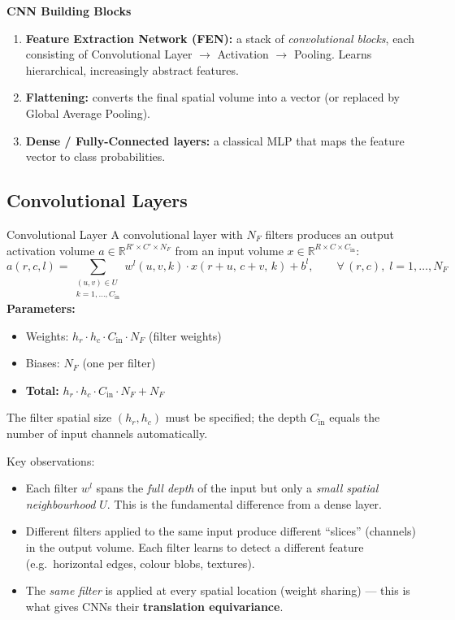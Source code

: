 \documentclass[11pt,a4paper]{article}
\newcommand{\term}[1]{\textcolor{DefGreen}{\textbf{#1}}}
\begin{document}
\begin{tcolorbox}[colback=LightBlue,colframe=AccentBlue,boxrule=0.8pt,arc=3pt]
\textbf{CNN Building Blocks}\\[4pt]
\begin{enumerate}
  \item \textbf{Feature Extraction Network (FEN):} a stack of \emph{convolutional blocks}, each consisting of Convolutional Layer $\to$ Activation $\to$ Pooling. Learns hierarchical, increasingly abstract features.
  \item \textbf{Flattening:} converts the final spatial volume into a vector (or replaced by Global Average Pooling).
  \item \textbf{Dense / Fully-Connected layers:} a classical MLP that maps the feature vector to class probabilities.
\end{enumerate}
\end{tcolorbox}

\subsection{Convolutional Layers}
\label{sec:conv_layers}

\begin{defbox}{Convolutional Layer}
A convolutional layer with $N_F$ filters produces an output activation volume $a \in \mathbb{R}^{R' \times C' \times N_F}$ from an input volume $x \in \mathbb{R}^{R \times C \times C_\text{in}}$:
\[
a(r,c,l) = \sum_{\substack{(u,v)\in U \\ k=1,\ldots,C_\text{in}}} w^l(u,v,k)\cdot x(r+u,\,c+v,\,k) + b^l, \qquad \forall\,(r,c),\; l=1,\ldots,N_F
\]
\textbf{Parameters:}
\begin{itemize}
  \item Weights: $h_r \cdot h_c \cdot C_\text{in} \cdot N_F$ (filter weights)
  \item Biases: $N_F$ (one per filter)
  \item \textbf{Total:} $h_r \cdot h_c \cdot C_\text{in} \cdot N_F + N_F$
\end{itemize}
The filter spatial size $(h_r, h_c)$ must be specified; the depth $C_\text{in}$ equals the number of input channels automatically.
\end{defbox}

Key observations:
\begin{itemize}
  \item Each filter $w^l$ spans the \emph{full depth} of the input but only a \emph{small spatial neighbourhood} $U$. This is the fundamental difference from a dense layer.
  \item Different filters applied to the same input produce different ``slices'' (channels) in the output volume. Each filter learns to detect a different feature (e.g.\ horizontal edges, colour blobs, textures).
  \item The \emph{same filter} is applied at every spatial location (weight sharing) — this is what gives CNNs their \term{translation equivariance}.
\end{itemize}
\end{document}
